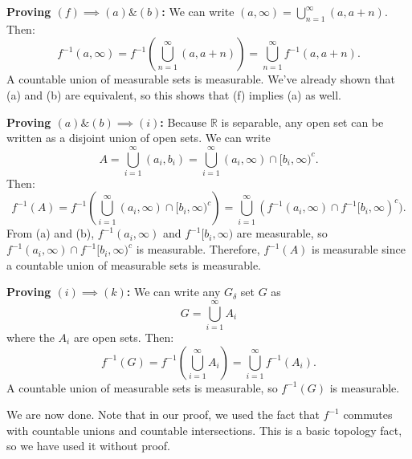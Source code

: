 \documentclass{article}
\begin{document}
\begin{enumerate}
    \textbf{Proving $(f) \implies (a)\&(b)$:} We can write $(a,\infty)=\bigcup_{n=1}^{\infty}(a, a+n).$ Then:
    \begin{equation}
        f^{-1}(a,\infty) = f^{-1}\left(\bigcup_{n=1}^{\infty}(a, a+n)\right) = \bigcup_{n=1}^{\infty} f^{-1}(a, a+n).
    \end{equation}
    A countable union of measurable sets is measurable. We've already shown that (a) and (b) are equivalent, so this shows that (f) implies (a) as well.

    \textbf{Proving $(a)\&(b) \implies (i)$:} Because $\mathbb{R}$ is separable, any open set can be written as a disjoint union of open sets. We can write 
    \begin{equation}
        A = \bigcup_{i=1}^{\infty} (a_i,b_i) = \bigcup_{i=1}^{\infty} (a_i,\infty) \cap [b_i,\infty)^c.
    \end{equation}
    Then:
    \begin{equation}
        f^{-1}(A) = f^{-1}\left(\bigcup_{i=1}^{\infty} (a_i,\infty) \cap [b_i,\infty)^c\right) = \bigcup_{i=1}^{\infty} (f^{-1}(a_i,\infty) \cap f^{-1}[b_i,\infty)^c).
    \end{equation}
    From (a) and (b), $f^{-1}(a_i,\infty)$ and $f^{-1}[b_i,\infty)$ are measurable, so $f^{-1}(a_i,\infty) \cap f^{-1}[b_i,\infty)^c$ is measurable. Therefore, $f^{-1}(A)$ is measurable since a countable union of measurable sets is measurable.

    \textbf{Proving $(i)\implies (k)$:} We can write any $G_\delta$ set $G$ as 
    \begin{equation}
        G = \bigcup_{i=1}^{\infty} A_i
    \end{equation}
    where the $A_i$ are open sets. Then:
    \begin{equation}
        f^{-1}(G) = f^{-1}\left(\bigcup_{i=1}^{\infty} A_i\right) = \bigcup_{i=1}^{\infty} f^{-1}(A_i).
    \end{equation} 
    A countable union of measurable sets is measurable, so $f^{-1}(G)$ is measurable.

    We are now done. Note that in our proof, we used the fact that $f^{-1}$ commutes with countable unions and countable intersections. This is a basic topology fact, so we have used it without proof.
\end{enumerate}
\end{document}
